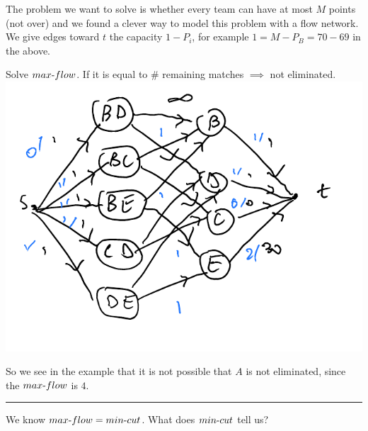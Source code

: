 \documentclass[12 pt]{article}
\begin{document}
        The problem we want to solve is whether every team can have at
        most $M$ points (not over) and we found a clever way to model
        this problem with a flow network. We give edges toward $t$ the
        capacity $1-P_i$, for example $1=M-P_B =
        70-69$ in the above.

        Solve $max\hbox{-}flow$. If it is equal to \# remaining
        matches $\implies$ not eliminated.
        \\ \includegraphics[width=.9\textwidth]{i88.pdf}

        So we see in the example that it is not possible that $A$ is
        not eliminated, since the $max\hbox{-}flow$ is $4$.
        \\ \noindent \rule{\textwidth}{0.5pt}
        We know $max\hbox{-}flow=min\hbox{-}cut$. What does
        $min\hbox{-}cut$ tell us?
\end{document}

